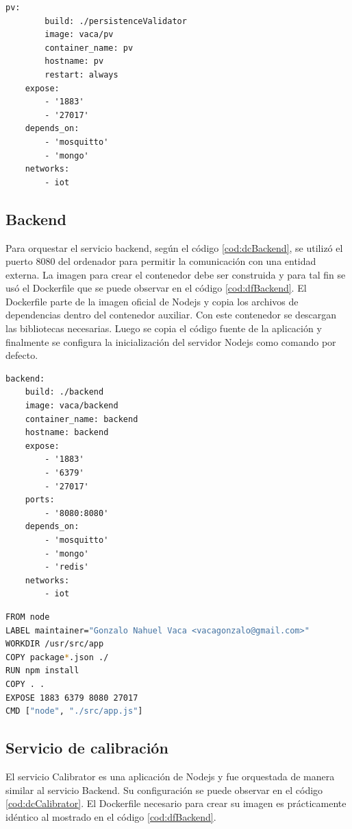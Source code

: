 \newpage

\begin{lstlisting}[label=cod:dcPV,caption=Orquestación del servicio pv.]
	pv:
		build: ./persistenceValidator
		image: vaca/pv
		container_name: pv
		hostname: pv
		restart: always
	expose: 
		- '1883'
		- '27017'
	depends_on: 
		- 'mosquitto'
		- 'mongo'
	networks: 
		- iot
\end{lstlisting}

\subsection{Backend}

Para orquestar el servicio backend, según el código \ref{cod:dcBackend}, se utilizó el puerto 8080 del ordenador para permitir la comunicación con una entidad externa.
La imagen para crear el contenedor debe ser construida y para tal fin se usó el Dockerfile que se puede observar en el código \ref{cod:dfBackend}.
El Dockerfile parte de la imagen oficial de Nodejs y copia los archivos de dependencias dentro del contenedor auxiliar.
Con este contenedor se descargan las bibliotecas necesarias.
Luego se copia el código fuente de la aplicación y finalmente se configura la inicialización del servidor Nodejs como comando por defecto.

\begin{lstlisting}[label=cod:dcBackend,caption=Orquestación del servicio Backend.]
backend:
	build: ./backend
	image: vaca/backend
	container_name: backend
	hostname: backend
	expose: 
		- '1883'
		- '6379'
		- '27017'
	ports: 
		- '8080:8080'
	depends_on:
		- 'mosquitto' 
		- 'mongo'
		- 'redis'
	networks: 
		- iot
\end{lstlisting}

\begin{lstlisting}[language=bash,label=cod:dfBackend,caption=Dockerfile del servicio Backend.]
FROM node
LABEL maintainer="Gonzalo Nahuel Vaca <vacagonzalo@gmail.com>"
WORKDIR /usr/src/app
COPY package*.json ./
RUN npm install
COPY . .
EXPOSE 1883 6379 8080 27017
CMD ["node", "./src/app.js"]
\end{lstlisting}

\subsection{Servicio de calibración}

El servicio Calibrator es una aplicación de Nodejs y fue orquestada de manera similar al servicio Backend.
Su configuración se puede observar en el código \ref{cod:dcCalibrator}.
El Dockerfile necesario para crear su imagen es prácticamente idéntico al mostrado en el código \ref{cod:dfBackend}.

